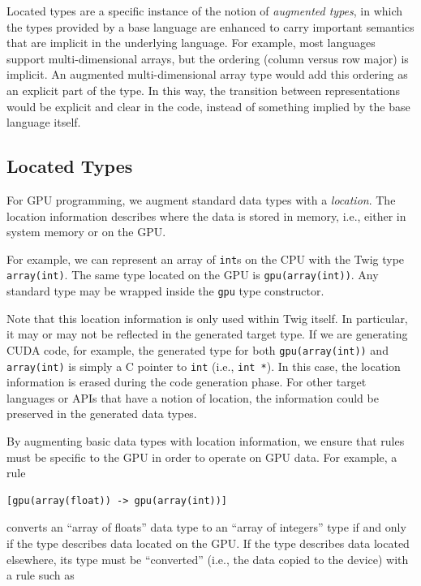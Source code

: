 Located types are a specific instance of the notion of \emph{augmented types}, in which the types provided by a base language are enhanced to carry important semantics that are implicit in the underlying language. For example, most languages support multi-dimensional arrays, but the ordering (column versus row major) is implicit. An augmented multi-dimensional array type would add this ordering as an explicit part of the type. In this way, the transition between representations would be explicit and clear in the code, instead of something implied by the base language itself.

\subsection{Located Types}
\label{sec:located-types}

For GPU programming, we augment standard data types with a  \emph{location}. The location information describes where the data is stored in memory, i.e., either in system memory or on the GPU.

For example, we can represent an array of \texttt{int}s on the CPU with the Twig type \texttt{array(int)}. The same type located on the GPU is \texttt{gpu(array(int))}. Any standard type may be wrapped inside the \texttt{gpu} type constructor.

Note that this location information is only used within Twig itself. In particular, it may or may not be reflected in the generated target type. If we are generating CUDA code, for example, the generated type for both \texttt{gpu(array(int))} and \texttt{array(int)} is simply a C pointer to \texttt{int} (i.e., \texttt{int *}). In this case, the location information is erased during the code generation phase. For other target languages or APIs that have a notion of location, the information could be preserved in the generated data types.

By augmenting basic data types with location information, we ensure that rules must be specific to the GPU in order to operate on GPU data. For example, a rule

\begin{verbatim}
[gpu(array(float)) -> gpu(array(int))]
\end{verbatim}

converts an ``array of floats'' data type to an ``array of integers'' type if and only if the type describes data located on the GPU. If the type describes data located elsewhere, its type must be ``converted'' (i.e., the data copied to the device) with a rule such as

